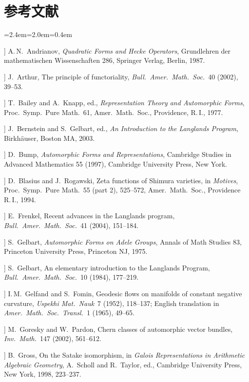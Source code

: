 \section*{参考文献}
\begingroup
\small
\begin{list}{}{\leftmargin=2.4em=2.0em=0.4em\itemsep=1.5pt}
\item[[A]] A.\,N.\ Andrianov, \emph{Quadratic Forms and Hecke Operators}, Grundlehren der mathematischen Wissenschaften 286, Springer Verlag, Berlin, 1987.
\item[[Ar]] J.\ Arthur, The principle of functoriality, \emph{Bull.\ Amer.\ Math.\ Soc.}\ 40 (2002), 39--53.
\item[[Ba]] T.\ Bailey and A.\ Knapp, ed., \emph{Representation Theory and Automorphic Forms}, Proc.\ Symp.\ Pure Math.\ 61, Amer.\ Math.\ Soc., Providence, R.\,I., 1977.
\item[[Be]] J.\ Bernstein and S.\ Gelbart, ed., \emph{An Introduction to the Langlands Program}, Birkh\"auser, Boston MA, 2003.
\item[[Bu]] D.\ Bump, \emph{Automorphic Forms and Representations}, Cambridge Studies in Advanced Mathematics 55 (1997), Cambridge University Press, New York.
\item[[BR]] D.\ Blasius and J.\ Rogawski, Zeta functions of Shimura varieties, in \emph{Motives}, Proc.\ Symp.\ Pure Math.\ 55 (part 2), 525--572, Amer.\ Math.\ Soc., Providence R.\,I., 1994.
\item[[F]] E.\ Frenkel, Recent advances in the Langlands program, \emph{Bull.\ Amer.\ Math.\ Soc.}\ 41 (2004), 151--184.
\item[[G1]] S.\ Gelbart, \emph{Automorphic Forms on Adele Groups}, Annals of Math Studies 83, Princeton University Press, Princeton NJ, 1975.
\item[[G2]] S.\ Gelbart, An elementary introduction to the Langlands Program, \emph{Bull.\ Amer.\ Math.\ Soc.}\ 10 (1984), 177--219.
\item[[GF]] I.\,M.\ Gelfand and S.\ Fomin, Geodesic flows on manifolds of constant negative curvature, \emph{Uspekhi Mat.\ Nauk}\ 7 (1952), 118--137; English translation in \emph{Amer.\ Math.\ Soc.\ Transl.}\ 1 (1965), 49--65.
\item[[GP]] M.\ Goresky and W.\ Pardon, Chern classes of automorphic vector bundles, \emph{Inv.\ Math.}\ 147 (2002), 561--612.
\item[[Gr]] B.\ Gross, On the Satake isomorphism, in \emph{Galois Representations in Arithmetic Algebraic Geometry}, A.\ Scholl and R.\ Taylor, ed., Cambridge University Press, New York, 1998, 223--237.

\end{list}
